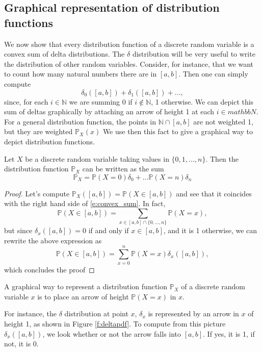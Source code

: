 \subsection{Graphical representation of distribution functions }
We now show that every distribution function of a discrete random variable is a convex sum of delta distributions. 
The $\delta$ distribution will be very useful to write the distribution of other random variables. Consider, for instance, that we want to count how many natural numbers there are in $[a,b]$. Then one can simply compute
$$
\delta_0([a,b])
 + \delta_1([a,b]) + ... ,$$
 since, for each $i\in \mathbb N$ we are summing 0 if $i \notin \mathbb N$, 1 otherwise. We can depict this sum of deltas graphically by attaching an arrow of height 1 at each $i \in mathbb N$.\\
 For a general distribution function, the points in $\mathbb N \cap [a,b]$ are not weighted 1, but they are weighted $\mathbb P_X(x)$
We use then this fact to give a graphical way to depict distribution functions. 

\begin{proposition}
Let $X$ be a discrete random variable taking values in $\{0,1,...,n\}$. Then the distribution function $\mathbb P_X$ can be written as the sum 
\begin{equation}
\label{e:convex_sum}
\mathbb P_X = \mathbb P(X = 0 )\delta_0 + \ldots \mathbb P(X = n) \delta_n
\end{equation}

\end{proposition}

\begin{proof}
Let's compute $\mathbb P_X([a,b]) = \mathbb P( X \in [a,b])$ and see that it coincides with the right hand side of \eqref{e:convex_sum}. In fact,
$$\mathbb P(X \in [a,b]) = \sum_{x \in [a,b] \cap \{0,...,n\}} \mathbb P(X = x  ),$$
but since $\delta_{x}([a,b]) = 0$ if and only if $x \in [a,b]$, and it is 1 otherwise, we can rewrite the above expression as 
$$
\mathbb P(X \in [a,b]) = \sum_{x = 0 }^n \mathbb P(X = x) \delta_x([a,b]),
$$
which concludes the proof
\end{proof}

A graphical way to represent a distribution function $\mathbb P_X$ of a discrete random variable $x$ is to place an arrow of height $\mathbb P(X = x)$ in $x$. 

\begin{example}[$\delta_x$]
    For instance, the $\delta$ distribution at point $x$, $\delta_x$ is represented by an arrow in $x$ of height 1, as shown in Figure \eqref{f:deltapdf}. To compute from this picture $\delta_x([a,b])$, we look whether or not the arrow falls into $[a,b]$. If yes, it is 1, if not, it is 0.
    
\end{example}

